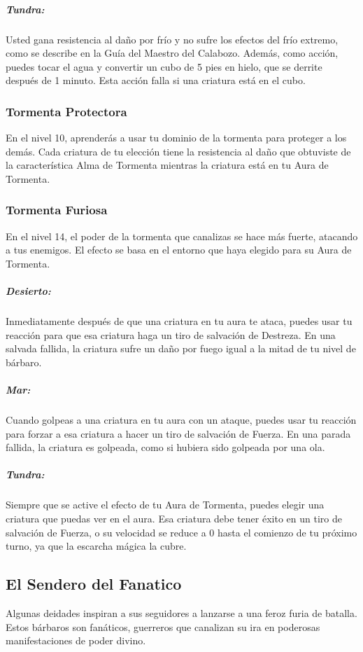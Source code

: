 \documentclass[a4paper,twocolumn,openany,10pt]{dndbook}
\begin{document}
\subparagraph{Tundra:} Usted gana resistencia al daño por frío y no sufre los efectos del frío extremo, como se describe en la Guía del Maestro
del Calabozo. Además, como acción, puedes tocar el agua y convertir un cubo de 5 pies en hielo, que se derrite después de 1 minuto. Esta
acción falla si una criatura está en el cubo.

\subsubsection{Tormenta Protectora}
En el nivel 10, aprenderás a usar tu dominio de la tormenta para proteger a los demás. Cada criatura de tu elección tiene la resistencia al
daño que obtuviste de la característica Alma de Tormenta mientras la criatura está en tu Aura de Tormenta. 

\subsubsection{Tormenta Furiosa}
En el nivel 14, el poder de la tormenta que canalizas se hace más fuerte, atacando a tus enemigos. El efecto se basa en el entorno que haya
elegido para su Aura de Tormenta.

\subparagraph{Desierto:} Inmediatamente después de que una criatura en tu aura te ataca, puedes usar tu reacción para que esa criatura haga un
tiro de salvación de Destreza. En una salvada fallida, la criatura sufre un daño por fuego igual a la mitad de tu nivel de bárbaro.

\subparagraph{Mar:} Cuando golpeas a una criatura en tu aura con un ataque, puedes usar tu reacción para forzar a esa criatura a hacer un tiro
de salvación de Fuerza. En una parada fallida, la criatura es golpeada, como si hubiera sido golpeada por una ola.

\subparagraph{Tundra:} Siempre que se active el efecto de tu Aura de Tormenta, puedes elegir una criatura que puedas ver en el aura. Esa
criatura debe tener éxito en un tiro de salvación de Fuerza, o su velocidad se reduce a 0 hasta el comienzo de tu próximo turno, ya que la
escarcha mágica la cubre. 

\subsection{El Sendero del Fanatico}

Algunas deidades inspiran a sus seguidores a lanzarse a una feroz furia de batalla. Estos bárbaros son fanáticos, guerreros que canalizan su
ira en poderosas manifestaciones de poder divino.
\end{document}
